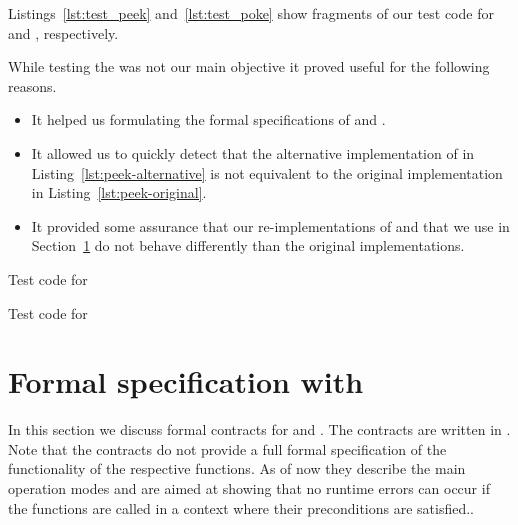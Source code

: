 Listings~\ref{lst:test_peek} and~\ref{lst:test_poke} show fragments of our test code
for \peek and \poke, respectively.

While testing the \bitwalker was not our main objective it proved useful for
the following reasons.

\begin{itemize}
\item It helped us formulating the formal specifications of \peek and \poke.
  
\item It allowed us to quickly detect that the alternative implementation of
      \peek in Listing~\ref{lst:peek-alternative} is not equivalent to the
      original implementation in Listing~\ref{lst:peek-original}.

\item It provided some assurance that our re-implementations of \peek and \poke
      that we use in Section~\ref{sec:formal-specification} do not behave differently
      than the original implementations.
\end{itemize}

\clearpage

\begin{listing}[hbt]
\begin{minipage}{\textwidth}

\end{minipage}
\caption{\label{lst:test_peek} Test code for \peek}
\end{listing}

\clearpage

\begin{listing}[hbt]
\begin{minipage}{\textwidth}

\end{minipage}
\caption{\label{lst:test_poke} Test code for \poke}
\end{listing}

\clearpage

\section{Formal specification with \acsl}
\label{sec:formal-specification}

In this section we discuss formal contracts for \peek and \poke.
The contracts are written in \acsl.
Note that the contracts do not provide a full formal specification
of the functionality of the respective functions.
As of now they describe the main operation modes and are aimed at showing
that no runtime errors can occur if the functions are called 
in a context where their preconditions are satisfied..

